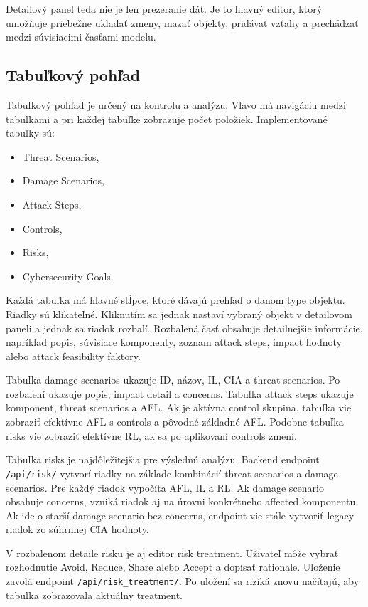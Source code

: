 \documentclass[11pt]{article}
\begin{document}
Detailový panel teda nie je len prezeranie dát. Je to hlavný editor, ktorý umožňuje priebežne ukladať zmeny, mazať objekty, pridávať vzťahy a prechádzať medzi súvisiacimi časťami modelu.

\subsection{Tabuľkový pohľad}

Tabuľkový pohľad je určený na kontrolu a analýzu. Vľavo má navigáciu medzi tabuľkami a pri každej tabuľke zobrazuje počet položiek. Implementované tabuľky sú:

\begin{itemize}
    \item Threat Scenarios,
    \item Damage Scenarios,
    \item Attack Steps,
    \item Controls,
    \item Risks,
    \item Cybersecurity Goals.
\end{itemize}

Každá tabuľka má hlavné stĺpce, ktoré dávajú prehľad o danom type objektu. Riadky sú klikateľné. Kliknutím sa jednak nastaví vybraný objekt v detailovom paneli a jednak sa riadok rozbalí. Rozbalená časť obsahuje detailnejšie informácie, napríklad popis, súvisiace komponenty, zoznam attack steps, impact hodnoty alebo attack feasibility faktory.

Tabuľka damage scenarios ukazuje ID, názov, IL, CIA a threat scenarios. Po rozbalení ukazuje popis, impact detail a concerns. Tabuľka attack steps ukazuje komponent, threat scenarios a AFL. Ak je aktívna control skupina, tabuľka vie zobraziť efektívne AFL s controls a pôvodné základné AFL. Podobne tabuľka risks vie zobraziť efektívne RL, ak sa po aplikovaní controls zmení.

Tabuľka risks je najdôležitejšia pre výslednú analýzu. Backend endpoint \texttt{/api/risk/} vytvorí riadky na základe kombinácií threat scenarios a damage scenarios. Pre každý riadok vypočíta AFL, IL a RL. Ak damage scenario obsahuje concerns, vzniká riadok aj na úrovni konkrétneho affected komponentu. Ak ide o starší damage scenario bez concerns, endpoint vie stále vytvoriť legacy riadok zo súhrnnej CIA hodnoty.

V rozbalenom detaile risku je aj editor risk treatment. Uživateľ môže vybrať rozhodnutie Avoid, Reduce, Share alebo Accept a dopísať rationale. Uloženie zavolá endpoint \texttt{/api/risk\_treatment/}. Po uložení sa riziká znovu načítajú, aby tabuľka zobrazovala aktuálny treatment.
\end{document}
